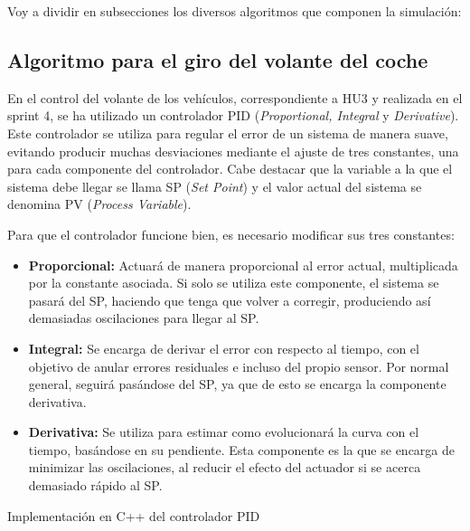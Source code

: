 Voy a dividir en subsecciones los diversos algoritmos que componen la simulación:

\subsection{Algoritmo para el giro del volante del coche}
\label{sec:pid-sec}

En el control del volante de los vehículos, correspondiente a HU3 y realizada en el sprint 4, se ha utilizado un controlador PID (\textit{Proportional, Integral} y \textit{Derivative}). Este controlador se utiliza para regular el error de un sistema de manera suave, evitando producir muchas desviaciones mediante el ajuste de tres constantes, una para cada componente del controlador. Cabe destacar que la variable a la que el sistema debe llegar se llama SP (\textit{Set Point}) y el valor actual del sistema se denomina PV (\textit{Process Variable}). 

\bigskip

Para que el controlador funcione bien, es necesario modificar sus tres constantes: 

\begin{itemize}
    \item \textbf{Proporcional: }Actuará de manera proporcional al error actual, multiplicada por la constante asociada. Si solo se utiliza este componente, el sistema se pasará del SP, haciendo que tenga que volver a corregir, produciendo así demasiadas oscilaciones para llegar al SP. 

    \item \textbf{Integral: }Se encarga de derivar el error con respecto al tiempo, con el objetivo de anular errores residuales e incluso del propio sensor. Por normal general, seguirá pasándose del SP, ya que de esto se encarga la componente derivativa.

    \item \textbf{Derivativa: }Se utiliza para estimar como evolucionará la curva con el tiempo, basándose en su pendiente. Esta componente es la que se encarga de minimizar las oscilaciones, al reducir el efecto del actuador si se acerca demasiado rápido al SP.
\end{itemize}

\bigskip


\begin{listing}[H]
    \caption{Implementación en C++ del controlador PID}
    \inputminted[fontsize=\scriptsize, linenos, bgcolor=LightGray, frame=lines, framesep=3mm, baselinestretch=1.2]{C++}{snippets/PID.cpp}
    \label{lst:pidcpp}
\end{listing}

